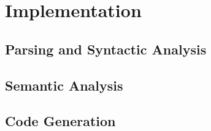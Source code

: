 %
%
%
\chapter{Implementation}\label{ch:implem}
\section{Parsing and Syntactic Analysis}\label{sec:parsing}
\section{Semantic Analysis}\label{sec:analysis}
\section{Code Generation}\label{sec:codegen}
